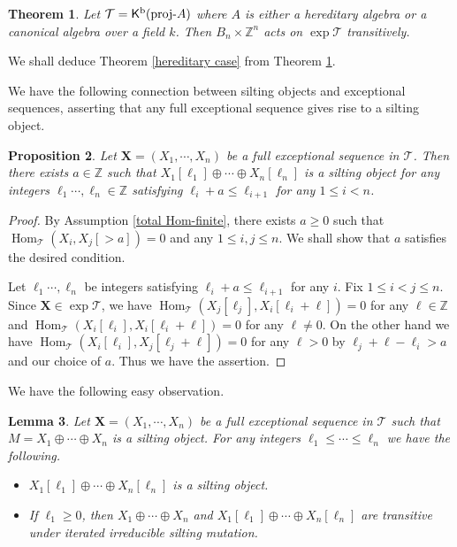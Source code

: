 \documentclass[a4paper,reqno]{amsart}
\newtheorem{theorem}{Theorem}[section]
\newtheorem{lemma}[theorem]{Lemma}
\newtheorem{proposition}[theorem]{Proposition}
\theoremstyle{definition}
\newcommand{\TT}{{\mathcal T}}
\newcommand{\Z}{\mathbb{Z}}
\newcommand{\Hom}{\operatorname{Hom}\nolimits}
\newcommand{\proj}[1]{{\rm{proj}}\text{-}#1} %
\newcommand{\exc}{\operatorname{exp}\nolimits}
\newcommand{\K}{\mathsf{K}}
\begin{document}
\begin{theorem}\cite{C,Rin,KM}\label{exceptional transitivity}
Let $\TT=\K^{\rm b}(\proj{A})$ where $A$ is either a hereditary algebra
or a canonical algebra over a field $k$. Then $B_n\times\Z^n$ acts on $\exc\TT$ transitively.
\end{theorem}

We shall deduce Theorem \ref{hereditary case} from Theorem \ref{exceptional transitivity}.

We have the following connection between silting objects and exceptional sequences,
asserting that any full exceptional sequence gives rise to a silting object.

\begin{proposition}\label{exceptional to silting}
Let ${\mathbf X}=(X_1,\cdots,X_n)$ be a full exceptional sequence in $\TT$.
Then there exists $a\in\Z$ such that $X_1[\ell_1]\oplus\cdots\oplus X_n[\ell_n]$
is a silting object for any integers $\ell_1\cdots,\ell_n\in\Z$
satisfying $\ell_i+a\le\ell_{i+1}$ for any $1\le i<n$.
\end{proposition}

\begin{proof}
By Assumption \ref{total Hom-finite}, there exists $a\ge0$
such that $\Hom_{\TT}(X_i,X_j[>a])=0$ and any $1\le i,j\le n$.
We shall show that $a$ satisfies the desired condition.

Let $\ell_1\cdots,\ell_n$ be integers satisfying $\ell_i+a\le\ell_{i+1}$ for any $i$.
Fix $1\le i<j\le n$. Since ${\mathbf X}\in\exc\TT$, we have
$\Hom_{\TT}(X_j[\ell_j],X_i[\ell_i+\ell])=0$ for any $\ell\in\Z$
and $\Hom_{\TT}(X_i[\ell_i],X_i[\ell_i+\ell])=0$ for any $\ell\neq0$.
On the other hand we have $\Hom_{\TT}(X_i[\ell_i],X_j[\ell_j+\ell])=0$
for any $\ell>0$ by $\ell_j+\ell-\ell_i>a$ and our choice of $a$.
Thus we have the assertion.
\end{proof}

We have the following easy observation.

\begin{lemma}\label{very silting}
Let ${\mathbf X}=(X_1,\cdots,X_n)$ be a full exceptional sequence in $\TT$
such that $M=X_1\oplus\cdots\oplus X_n$ is a silting object.
For any integers $\ell_1\le\cdots\le \ell_n$ we have the following.
\begin{itemize}
\item[(1)] $X_1[\ell_1]\oplus\cdots\oplus X_n[\ell_n]$ is a silting object.
\item[(2)] If $\ell_1\ge0$, then $X_1\oplus\cdots\oplus X_n$ and
$X_1[\ell_1]\oplus\cdots\oplus X_n[\ell_n]$ are transitive under
iterated irreducible silting mutation.
\end{itemize}
\end{lemma}
\end{document}
